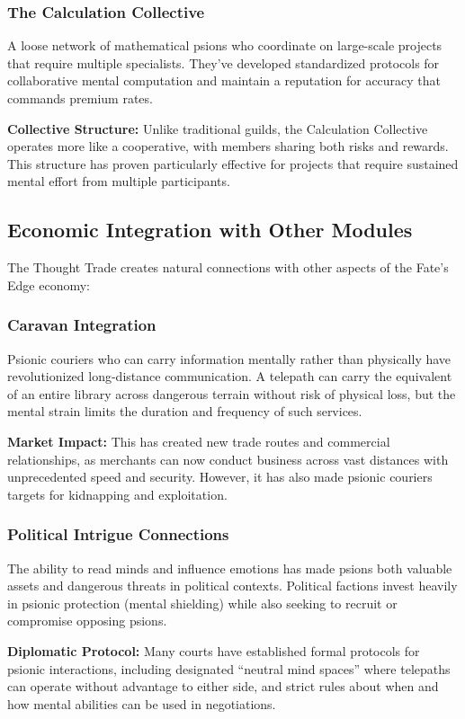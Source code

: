 \documentclass[11pt,twoside]{article}
\begin{document}
\subsubsection{The Calculation Collective}
A loose network of mathematical psions who coordinate on large-scale projects that require multiple specialists. They've developed standardized protocols for collaborative mental computation and maintain a reputation for accuracy that commands premium rates.

\textbf{Collective Structure:} Unlike traditional guilds, the Calculation Collective operates more like a cooperative, with members sharing both risks and rewards. This structure has proven particularly effective for projects that require sustained mental effort from multiple participants.

\subsection{Economic Integration with Other Modules}

The Thought Trade creates natural connections with other aspects of the Fate's Edge economy:

\subsubsection{Caravan Integration}
Psionic couriers who can carry information mentally rather than physically have revolutionized long-distance communication. A telepath can carry the equivalent of an entire library across dangerous terrain without risk of physical loss, but the mental strain limits the duration and frequency of such services.

\textbf{Market Impact:} This has created new trade routes and commercial relationships, as merchants can now conduct business across vast distances with unprecedented speed and security. However, it has also made psionic couriers targets for kidnapping and exploitation.

\subsubsection{Political Intrigue Connections}
The ability to read minds and influence emotions has made psions both valuable assets and dangerous threats in political contexts. Political factions invest heavily in psionic protection (mental shielding) while also seeking to recruit or compromise opposing psions.

\textbf{Diplomatic Protocol:} Many courts have established formal protocols for psionic interactions, including designated ``neutral mind spaces'' where telepaths can operate without advantage to either side, and strict rules about when and how mental abilities can be used in negotiations.
\end{document}
